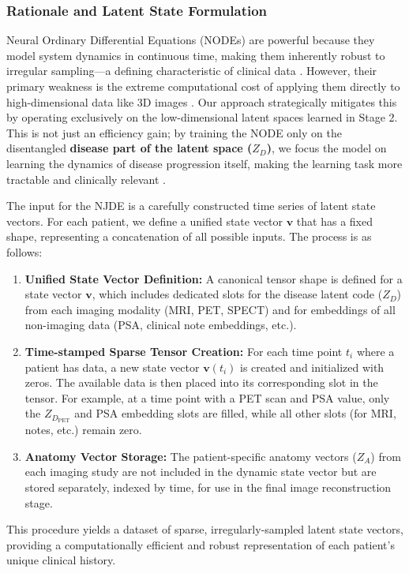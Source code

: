 \documentclass[11pt, a4paper]{article}
\begin{document}
\subsubsection{Rationale and Latent State Formulation}
Neural Ordinary Differential Equations (NODEs) are powerful because they model system dynamics in continuous time, making them inherently robust to irregular sampling—a defining characteristic of clinical data \cite{GwakSim2020, JohnsonBulgarelli2023, BelogolovskyGreenberg2023}. However, their primary weakness is the extreme computational cost of applying them directly to high-dimensional data like 3D images \cite{WiewelBecher2018, DavisChoromanski2020}. Our approach strategically mitigates this by operating exclusively on the low-dimensional latent spaces learned in Stage 2. This is not just an efficiency gain; by training the NODE only on the disentangled \textbf{disease part of the latent space ($Z_D$)}, we focus the model on learning the dynamics of disease progression itself, making the learning task more tractable and clinically relevant \cite{AshmanSo2020, KberKalisch2023, LosadaTerranova2024}.

The input for the NJDE is a carefully constructed time series of latent state vectors. For each patient, we define a unified state vector $\mathbf{v}$ that has a fixed shape, representing a concatenation of all possible inputs. The process is as follows:
\begin{enumerate}
    \item \textbf{Unified State Vector Definition:} A canonical tensor shape is defined for a state vector $\mathbf{v}$, which includes dedicated slots for the disease latent code ($Z_D$) from each imaging modality (MRI, PET, SPECT) and for embeddings of all non-imaging data (PSA, clinical note embeddings, etc.).
    \item \textbf{Time-stamped Sparse Tensor Creation:} For each time point $t_i$ where a patient has data, a new state vector $\mathbf{v}(t_i)$ is created and initialized with zeros. The available data is then placed into its corresponding slot in the tensor. For example, at a time point with a PET scan and PSA value, only the $Z_{D_{\text{PET}}}$ and PSA embedding slots are filled, while all other slots (for MRI, notes, etc.) remain zero.
    \item \textbf{Anatomy Vector Storage:} The patient-specific anatomy vectors ($Z_A$) from each imaging study are not included in the dynamic state vector but are stored separately, indexed by time, for use in the final image reconstruction stage.
\end{enumerate}
This procedure yields a dataset of sparse, irregularly-sampled latent state vectors, providing a computationally efficient and robust representation of each patient's unique clinical history.
\end{document}
